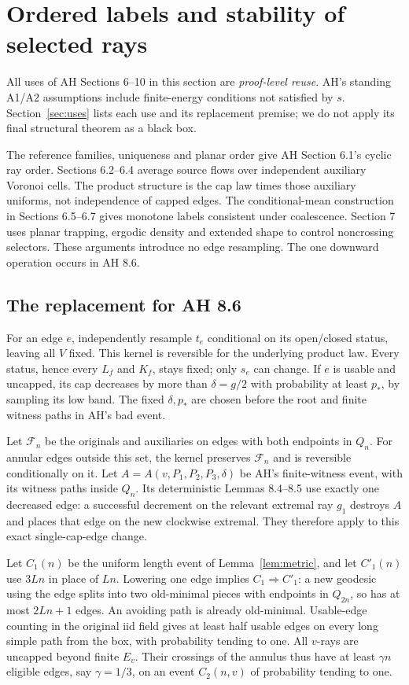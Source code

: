 \section{Ordered labels and stability of selected rays}\label{sec:labels}
All uses of AH Sections 6--10 in this section are \emph{proof-level reuse}.
AH's standing A1/A2 assumptions include finite-energy conditions not satisfied
by $s$. Section~\ref{sec:uses} lists each use and its replacement premise;
we do not apply its final structural theorem as a black box.

The reference families, uniqueness and planar order give AH Section 6.1's
cyclic ray order. Sections 6.2--6.4 average source flows over independent
auxiliary Voronoi cells. The product structure is the cap law times those
auxiliary uniforms, not independence of capped edges. The conditional-mean
construction in Sections 6.5--6.7 gives monotone labels consistent under
coalescence. Section 7 uses planar trapping, ergodic density and extended
shape to control noncrossing selectors. These arguments introduce no edge
resampling. The one downward operation occurs in AH 8.6.

\subsection{The replacement for AH 8.6}
For an edge $e$, independently resample $t_e$ conditional on its open/closed
status, leaving all $V$ fixed. This kernel is reversible for the underlying
product law. Every status, hence every $L_f$ and $K_f$, stays fixed; only
$s_e$ can change. If $e$ is usable and uncapped, its cap decreases by more
than $\delta=g/2$ with probability at least $p_*$, by sampling its low band.
The fixed $\delta,p_*$ are chosen before the root and finite witness paths
in AH's bad event.

Let $\mathcal F_n$ be the originals and auxiliaries on edges with both
endpoints in $Q_n$. For annular edges outside this set, the kernel preserves
$\mathcal F_n$ and is reversible conditionally on it. Let
$A=A(v,P_1,P_2,P_3,\delta)$ be AH's finite-witness event, with its witness
paths inside $Q_n$. Its deterministic Lemmas 8.4--8.5 use exactly one
decreased edge: a successful decrement on the relevant extremal ray $g_1$
destroys $A$ and places that edge on the new clockwise extremal. They
therefore apply to this exact single-cap-edge change.

Let $C_1(n)$ be the uniform length event of Lemma~\ref{lem:metric}, and let
$C'_1(n)$ use $3Ln$ in place of $Ln$. Lowering one edge implies
$C_1\Rightarrow C'_1$: a new geodesic using the edge splits into two
old-minimal pieces with endpoints in $Q_{2n}$, so has at most $2Ln+1$
edges. An avoiding path is already old-minimal. Usable-edge counting in
the original iid field gives at least half usable edges on every long
simple path from the box, with probability tending to one. All $v$-rays
are uncapped beyond finite $E_v$. Their crossings of the annulus thus have
at least $\gamma n$ eligible edges, say $\gamma=1/3$, on an event $C_2(n,v)$
of probability tending to one.

